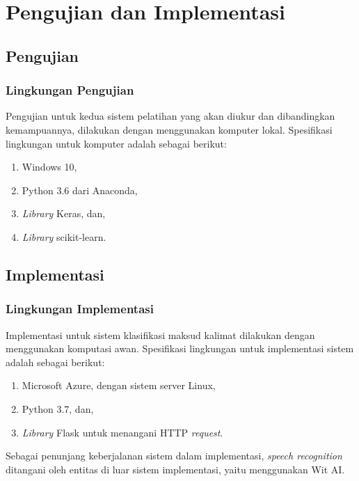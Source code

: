 \chapter{Pengujian dan Implementasi}

\section{Pengujian}

\subsection{Lingkungan Pengujian}

Pengujian untuk kedua sistem pelatihan yang akan diukur dan dibandingkan kemampuannya, dilakukan dengan menggunakan komputer lokal. Spesifikasi lingkungan untuk komputer adalah sebagai berikut:

\begin{enumerate}
    \item Windows 10,
    \item Python 3.6 dari Anaconda,
    \item \textit{Library} Keras, dan,
    \item \textit{Library} scikit-learn.
\end{enumerate}

\blindtext

\section{Implementasi}

\subsection{Lingkungan Implementasi}

Implementasi untuk sistem klasifikasi maksud kalimat dilakukan dengan menggunakan komputasi awan. Spesifikasi lingkungan untuk implementasi sistem adalah sebagai berikut:

\begin{enumerate}
    \item Microsoft Azure, dengan sistem server Linux,
    \item Python 3.7, dan,
    \item \textit{Library} Flask untuk menangani HTTP \textit{request}.
\end{enumerate}

Sebagai penunjang keberjalanan sistem dalam implementasi, \textit{speech recognition} ditangani oleh entitas di luar sistem implementasi, yaitu menggunakan Wit AI.